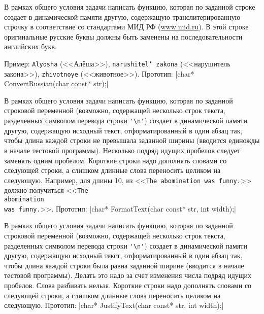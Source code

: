 \begin{zztask}
В рамках общего условия задачи написать функцию, которая по заданной строке
создает в динамической памяти другую, содержащую транслитерированную
строчку в соответствие со стандартами МИД РФ (\url{www.mid.ru}).
В этой строке оригинальные русские буквы должны быть заменены на
последовательности английских букв.

Пример:
\texttt{Alyosha} (<<Алёша>>), \texttt{narushitel{'} zakona}
(<<нарушитель закона>>), \texttt{zhivotnoye} (<<животное>>).
%
Прототип: |char* ConvertRussian(char const* str);|
\end{zztask}

\begin{zztask}
В рамках общего условия задачи написать функцию, которая по заданной строковой
переменной (возможно, содержащей несколько строк текста, разделенных символом
перевода строки \verb|'\n'|) создает в динамической памяти другую, содержащую
исходный текст, отформатированный в один абзац так, чтобы длина каждой
строки не превышала заданной ширины (вводится единожды в начале тестовой программы).
Несколько подряд идущих пробелов следует заменять одним пробелом.
Короткие строки надо дополнять словами со следующей строки, а слишком
длинные слова переносить целиком на следующую.
Например, для длины 10, из
<<\texttt{The abomination was                funny.}>>
должно получиться
<<\texttt{The \\abomination\\was funny.}>>.
%
Прототип:
 |char* FormatText(char const* str, int width);|
\end{zztask}

\begin{zztask}
В рамках общего условия задачи написать функцию, которая по заданной строковой
переменной (возможно, содержащей несколько строк текста, разделенных символом
перевода строки \verb|'\n'|) создает в динамической памяти другую, содержащую
исходный текст, отформатированный в один абзац так, чтобы длина каждой
строки была равна заданной ширине (вводится в начале тестовой программы).
Делать это надо за счет изменения числа подряд идущих пробелов. Слова
разбивать нельзя. Короткие строки надо дополнять словами со следующей
строки, а слишком длинные слова переносить целиком на следующую.
%
Прототип: 
|char* JustifyText(char const* str, int width);|
\end{zztask}
